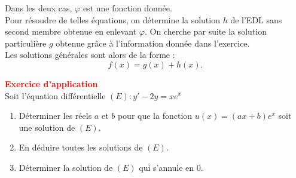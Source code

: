 \documentclass[12pt]{article}
\begin{document}
Dans les deux cas, $\varphi$ est une fonction donnée.\\

Pour résoudre de telles équations, on détermine la solution $h$ de l’EDL sans second membre obtenue en enlevant $\varphi$. On cherche par suite la solution particulière $g$ obtenue grâce à l’information donnée dans l’exercice.\\

Les solutions générales sont alors de la forme : 
\[
\boxed{f(x) = g(x) + h(x)}.
\]

\vspace{0.4cm}
\textbf{\textcolor{red}{Exercice d'application}}\\
Soit l’équation différentielle $(E) : y' - 2y = xe^x$
\begin{enumerate}
    \item Déterminer les réels $a$ et $b$ pour que la fonction $u(x) = (ax + b)e^x$ soit une solution de $(E)$.
    \item En déduire toutes les solutions de $(E)$.
    \item Déterminer la solution de $(E)$ qui s’annule en $0$.
\end{enumerate}
\end{document}
